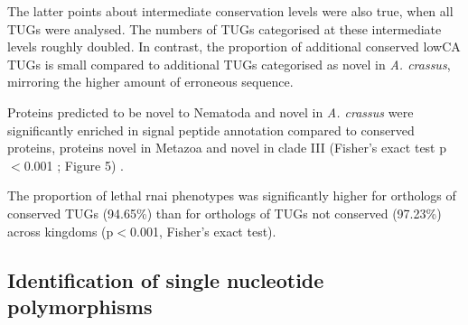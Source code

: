 \documentclass[10pt]{bmc_article}
\newenvironment{bmcformat}{\begin{raggedright}\baselineskip20pt\sloppy\setboolean{publ}{false}}{\end{raggedright}\baselineskip20pt\sloppy}
\begin{document}
\begin{bmcformat}
The latter points about intermediate conservation levels were also
true, when all TUGs were analysed. The numbers of TUGs categorised at
these intermediate levels roughly doubled. In contrast, the proportion
of additional conserved lowCA TUGs is small compared to additional
TUGs categorised as novel in \textit{A. crassus}, mirroring the higher
amount of erroneous sequence.

Proteins predicted to be novel to Nematoda and novel in
\textit{A. crassus} were significantly enriched in signal peptide
annotation compared to conserved proteins, proteins novel in Metazoa
and novel in clade III (Fisher's exact test p$<$0.001 ; Figure 5) .

The proportion of lethal rnai phenotypes was significantly higher for
orthologs of conserved TUGs
(94.65\%) than for orthologs of
TUGs not conserved (97.23\%) across
kingdoms (p$<$0.001, Fisher's exact test).

\subsection*{Identification of single nucleotide polymorphisms}


\end{bmcformat}
\end{document}
